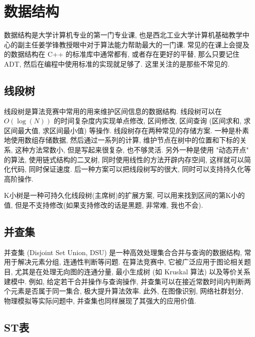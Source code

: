 \documentclass[a4paper]{ctexart}
\begin{document}
\section{数据结构}

数据结构是大学计算机专业的第一门专业课, 也是西北工业大学计算机基础教学中心的副主任姜学锋教授眼中对于算法能力帮助最大的一门课. 常见的在课上会提及的数据结构在 C++ 的标准库中通常都有, 或者存在更好的平替, 那么只要记住 ADT, 然后在编程中使用标准的实现就足够了. 这里关注的是那些不常见的.

\subsection{线段树}

线段树是算法竞赛中常用的用来维护区间信息的数据结构. 线段树可以在 $O(\log(N))$ 的时间复杂度内实现单点修改, 区间修改, 区间查询 (区间求和, 求区间最大值, 求区间最小值) 等操作. 线段树存在两种常见的存储方案. 一种是朴素地使用数组存储数据, 然后通过一系列的计算, 维护节点在树中的位置和下标的关系, 这种方法常数小, 但是写起来很复杂, 也不够灵活. 另外一种是使用 "动态开点" 的算法, 使用链式结构的二叉树, 同时使用线性的方法开辟内存空间, 这样就可以简化代码, 同时保证速度. 后一种方案可以把线段树写的很大, 同时可以支持持久化等高阶操作.

K小树是一种可持久化线段树(主席树)的扩展方案, 可以用来找到区间的第K小的值, 但是不支持修改(如果支持修改的话是黑题, 非常难, 我也不会).



\subsection{并查集}

并查集 (Disjoint Set Union, DSU) 是一种高效处理集合合并与查询的数据结构, 常用于解决元素分组, 连通性判断等问题. 在算法竞赛中, 它被广泛应用于图论相关题目, 尤其是在处理无向图的连通分量, 最小生成树 (如 Kruskal 算法) 以及等价关系建模中. 例如, 给定若干合并操作与查询操作, 并查集可以在接近常数时间内判断两个元素是否属于同一集合, 极大提升算法效率. 此外, 在图像识别, 网络社群划分, 物理模拟等实际问题中, 并查集也同样展现了其强大的应用价值.



\subsection{ST表}
\end{document}
